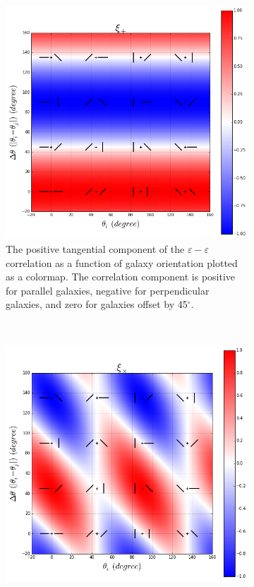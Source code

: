 \documentclass[%
 reprint,
 amsmath,amssymb,
 aps,nofootinbib
]{revtex4-1}
\begin{document}
\begin{figure}
    \centering
    \begin{subfigure}[H]{0.45\textwidth}
        \includegraphics[width=\textwidth]{figs-swe/xip_colormap.png}
        \captionsetup{justification=raggedright,singlelinecheck=false}
        \caption{The positive tangential component of the $\varepsilon-\varepsilon$ correlation as a function of galaxy orientation plotted as a colormap. The correlation component is positive for parallel galaxies, negative for perpendicular galaxies, and zero for galaxies offset by 45$^\circ$.}
        \label{xip_colormap}
    \end{subfigure}
    ~
    \begin{subfigure}[H]{0.45\textwidth}
        \includegraphics[width=\textwidth]{figs-swe/xix_colormap.png}

\end{subfigure}
\end{figure}
\end{document}
